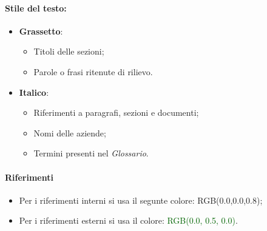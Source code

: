 \paragraph*{Stile del testo:}
\begin{itemize}
    \item \textbf{Grassetto}:
    \begin{itemize}
        \item Titoli delle sezioni;
        \item Parole o frasi ritenute di rilievo.
    \end{itemize}
    \item \textbf{Italico}:
    \begin{itemize}
        \item Riferimenti a paragrafi, sezioni e documenti;
        \item Nomi delle aziende;
        \item Termini presenti nel \textit{Glossario}.
    \end{itemize}
\end{itemize}

\paragraph*{Riferimenti}
    \begin{itemize}
        \item Per i riferimenti interni si usa il segunte colore: \textcolor{navyblue}{RGB(0.0,0.0,0.8)};
        \item Per i riferimenti esterni si usa il colore: \textcolor{darkgreen}{RGB(0.0, 0.5, 0.0)}.
\end{itemize}

